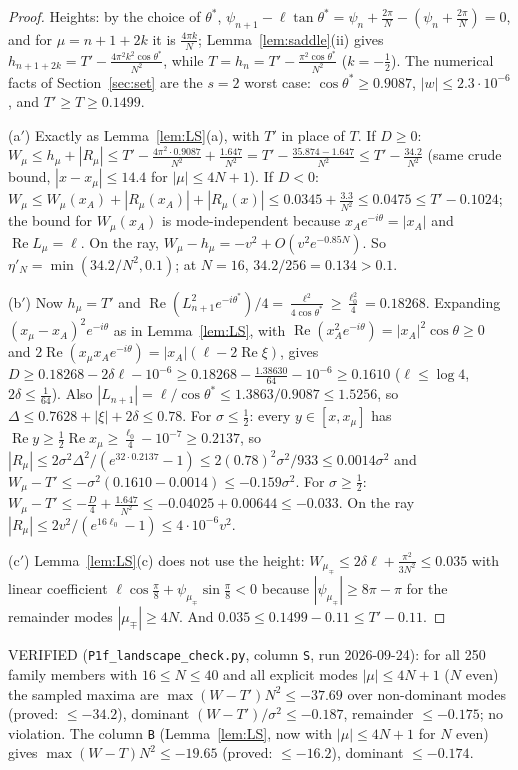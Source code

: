 \documentclass[11pt]{article}
\theoremstyle{definition}\newtheorem{definition}[theorem]{Definition}
\theoremstyle{remark}\newtheorem{remark}[theorem]{Remark}
\begin{document}
\begin{proof}
Heights: by the choice of $\theta^*$, $\psi_{n+1}-\ell\tan\theta^*=\psi_n+\frac{2\pi}N-(\psi_n+\frac{2\pi}N)=0$, and for $\mu=n+1+2k$ it is $\frac{4\pi k}N$; Lemma~\ref{lem:saddle}(ii) gives $h_{n+1+2k}=T'-\frac{4\pi^2k^2\cos\theta^*}{N^2}$, while $T=h_n=T'-\frac{\pi^2\cos\theta^*}{N^2}$ ($k=-\frac12$). The numerical facts of Section~\ref{sec:set} are the $s=2$ worst case: $\cos\theta^*\ge0.9087$, $|w|\le2.3\cdot10^{-6}$, and $T'\ge T\ge0.1499$.

(a$'$) Exactly as Lemma~\ref{lem:LS}(a), with $T'$ in place of $T$. If $D\ge0$: $W_\mu\le h_\mu+|R_\mu|\le T'-\frac{4\pi^2\cdot0.9087}{N^2}+\frac{1.647}{N^2}=T'-\frac{35.874-1.647}{N^2}\le T'-\frac{34.2}{N^2}$ (same crude bound, $|x-x_\mu|\le14.4$ for $|\mu|\le4N+1$). If $D<0$: $W_\mu\le W_\mu(x_A)+|R_\mu(x_A)|+|R_\mu(x)|\le0.0345+\frac{3.3}{N^2}\le0.0475\le T'-0.1024$; the bound for $W_\mu(x_A)$ is mode-independent because $x_Ae^{-i\theta}=|x_A|$ and $\operatorname{Re}L_\mu=\ell$. On the ray, $W_\mu-h_\mu=-v^2+O(v^2e^{-0.85N})$. So $\eta'_N=\min(34.2/N^2,0.1)$; at $N=16$, $34.2/256=0.134>0.1$.

(b$'$) Now $h_\mu=T'$ and $\operatorname{Re}(L_{n+1}^2e^{-i\theta^*})/4=\frac{\ell^2}{4\cos\theta^*}\ge\frac{\ell_0^2}4=0.18268$. Expanding $(x_\mu-x_A)^2e^{-i\theta}$ as in Lemma~\ref{lem:LS}, with $\operatorname{Re}(x_A^2e^{-i\theta})=|x_A|^2\cos\theta\ge0$ and $2\operatorname{Re}(x_\mu x_Ae^{-i\theta})=|x_A|(\ell-2\operatorname{Re}\xi)$, gives $D\ge0.18268-2\delta\ell-10^{-6}\ge0.18268-\frac{1.38630}{64}-10^{-6}\ge0.1610$ ($\ell\le\log4$, $2\delta\le\frac1{64}$). Also $|L_{n+1}|=\ell/\cos\theta^*\le1.3863/0.9087\le1.5256$, so $\Delta\le0.7628+|\xi|+2\delta\le0.78$. For $\sigma\le\frac12$: every $y\in[x,x_\mu]$ has $\operatorname{Re}y\ge\frac12\operatorname{Re}x_\mu\ge\frac{\ell_0}4-10^{-7}\ge0.2137$, so $|R_\mu|\le2\sigma^2\Delta^2/(e^{32\cdot0.2137}-1)\le2(0.78)^2\sigma^2/933\le0.0014\sigma^2$ and $W_\mu-T'\le-\sigma^2(0.1610-0.0014)\le-0.159\sigma^2$. For $\sigma\ge\frac12$: $W_\mu-T'\le-\frac D4+\frac{1.647}{N^2}\le-0.04025+0.00644\le-0.033$. On the ray $|R_\mu|\le2v^2/(e^{16\ell_0}-1)\le4\cdot10^{-6}v^2$.

(c$'$) Lemma~\ref{lem:LS}(c) does not use the height: $W_{\mu_\mp}\le2\delta\ell+\frac{\pi^2}{3N^2}\le0.035$ with linear coefficient $\ell\cos\frac\pi8+\psi_{\mu_\mp}\sin\frac\pi8<0$ because $|\psi_{\mu_\mp}|\ge8\pi-\pi$ for the remainder modes $|\mu_\mp|\ge4N$. And $0.035\le0.1499-0.11\le T'-0.11$.
\end{proof}
VERIFIED (\texttt{P1f\_landscape\_check.py}, column \texttt{S}, run 2026-09-24): for all 250 family members with $16\le N\le40$ and all explicit modes $|\mu|\le4N+1$ ($N$ even) the sampled maxima are $\max(W-T')N^2\le-37.69$ over non-dominant modes (proved: $\le-34.2$), dominant $(W-T')/\sigma^2\le-0.187$, remainder $\le-0.175$; no violation. The column \texttt{B} (Lemma~\ref{lem:LS}, now with $|\mu|\le4N+1$ for $N$ even) gives $\max(W-T)N^2\le-19.65$ (proved: $\le-16.2$), dominant $\le-0.174$.
\end{document}
